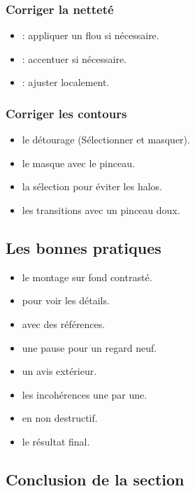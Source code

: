 \subsubsection{Corriger la netteté}

\begin{itemize}
    \item {} : appliquer un flou si nécessaire.
    \item {} : accentuer si nécessaire.
    \item {} : ajuster localement.
\end{itemize}

\subsubsection{Corriger les contours}

\begin{itemize}
    \item {} le détourage (Sélectionner et masquer).
    \item {} le masque avec le pinceau.
    \item {} la sélection pour éviter les halos.
    \item {} les transitions avec un pinceau doux.
\end{itemize}

\subsection{Les bonnes pratiques}

\begin{itemize}
    \item {} le montage sur fond contrasté.
    \item {} pour voir les détails.
    \item {} avec des références.
    \item {} une pause pour un regard neuf.
    \item {} un avis extérieur.
    \item {} les incohérences une par une.
    \item {} en non destructif.
    \item {} le résultat final.
\end{itemize}

\subsection*{Conclusion de la section}

